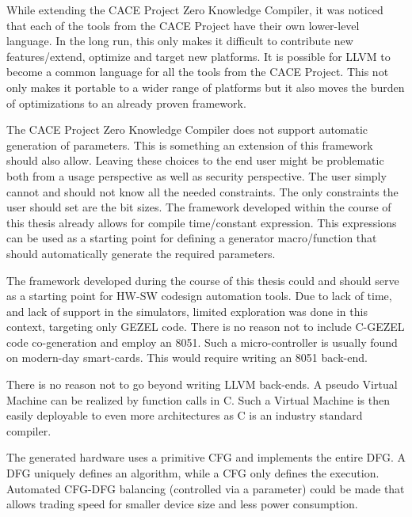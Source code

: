 While extending the CACE Project Zero Knowledge Compiler, it was
noticed that each of the tools from the CACE Project have their own
lower-level language. In the long run, this only makes it difficult to
contribute new features/extend, optimize and target new platforms. It
is possible for LLVM to become a common language for all the tools
from the CACE Project. This not only makes it portable to a wider
range of platforms but it also moves the burden of optimizations to an
already proven framework.

The CACE Project Zero Knowledge Compiler does not support automatic
generation of parameters. This is something an extension of this
framework should also allow. Leaving these choices to the end user
might be problematic both from a usage perspective as well as security
perspective. The user simply cannot and should not know all the needed
constraints. The only constraints the user should set are the bit
sizes. The framework developed within the course of this thesis
already allows for compile time/constant expression. This expressions
can be used as a starting point for defining a generator
macro/function that should automatically generate the required
parameters.

The framework developed during the course of this thesis could and
should serve as a starting point for HW-SW codesign automation tools.
Due to lack of time, and lack of support in the simulators, limited
exploration was done in this context, targeting only GEZEL code. There
is no reason not to include C-GEZEL code co-generation and employ an
8051. Such a micro-controller is usually found on modern-day
smart-cards. This would require writing an 8051 back-end.

There is no reason not to go beyond writing LLVM back-ends. A pseudo
Virtual Machine can be realized by function calls in C. Such a Virtual
Machine is then easily deployable to even more architectures as C is
an industry standard compiler.

The generated hardware uses a primitive CFG and implements the entire
DFG. A DFG uniquely defines an algorithm, while a CFG only defines the
execution. Automated CFG-DFG balancing (controlled via a parameter)
could be made that allows trading speed for smaller device size and
less power consumption.

